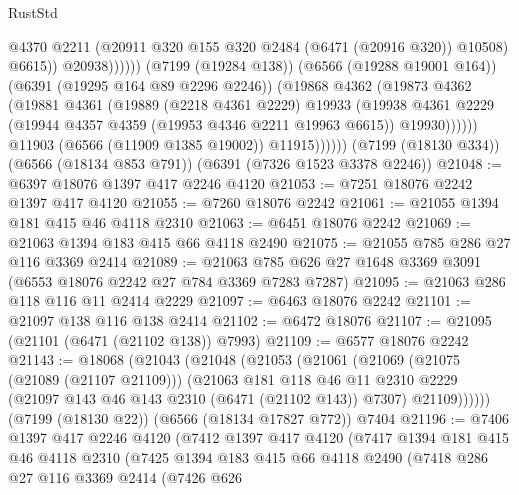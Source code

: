 \begin{lexlean}{RustStd}
\begin{coremodule}
                                  @4370
                                  @2211
                                  (@20911 @320 @155 @320 @2484 (@6471 (@20916 @320)) @10508)
                                  @6615))
                              @20938))))))
                  (@7199 (@19284 @138))
                  (@6566 (@19288 @19001 @164))
                  (@6391 (@19295 @164 @89 @2296 @2246))
                  (@19868
                    @4362
                    (@19873
                      @4362
                      (@19881
                        @4361
                        (@19889
                          (@2218 @4361 @2229)
                          @19933
                          (@19938
                            @4361
                            @2229
                            (@19944 @4357 @4359 (@19953 @4346 @2211 @19963 @6615))
                            @19930))))))
                @11903
                (@6566 (@11909 @1385 @19002))
                @11915))))))
    (@7199 (@18130 @334))
    (@6566 (@18134 @853 @791))
    (@6391 (@7326 @1523 @3378 @2246))
@21048 := @6397 @18076 @1397 @417 @2246 @4120
@21053 := @7251 @18076 @2242 @1397 @417 @4120
@21055 := @7260 @18076 @2242
@21061 := @21055 @1394 @181 @415 @46 @4118 @2310
@21063 := @6451 @18076 @2242
@21069 := @21063 @1394 @183 @415 @66 @4118 @2490
@21075 := @21055 @785 @286 @27 @116 @3369 @2414
@21089 := @21063 @785 @626 @27 @1648 @3369 @3091 (@6553 @18076 @2242 @27 @784 @3369 @7283 @7287)
@21095 := @21063 @286 @118 @116 @11 @2414 @2229
@21097 := @6463 @18076 @2242
@21101 := @21097 @138 @116 @138 @2414
@21102 := @6472 @18076
@21107 := @21095 (@21101 (@6471 (@21102 @138)) @7993)
@21109 := @6577 @18076 @2242
@21143 := @18068
    (@21043
      (@21048
        (@21053
          (@21061
            (@21069
              (@21075 (@21089 (@21107 @21109)))
              (@21063
                @181
                @118
                @46
                @11
                @2310
                @2229
                (@21097 @143 @46 @143 @2310 (@6471 (@21102 @143)) @7307)
                @21109))))))
    (@7199 (@18130 @22))
    (@6566 (@18134 @17827 @772))
    @7404
@21196 := @7406
    @1397
    @417
    @2246
    @4120
    (@7412
      @1397
      @417
      @4120
      (@7417
        @1394
        @181
        @415
        @46
        @4118
        @2310
        (@7425
          @1394
          @183
          @415
          @66
          @4118
          @2490
          (@7418
            @286
            @27
            @116
            @3369
            @2414
            (@7426
              @626

\end{coremodule}
\end{lexlean}

